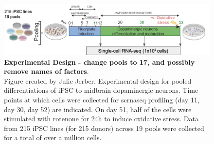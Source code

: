 \begin{figure}[h]
\centering
\includegraphics[width=15.5cm]{Chapter5/Fig/neuroseq_experimental_design.png}
\caption[Experimental Design]{\textbf{Experimental Design - change pools to 17, and possibly remove names of factors}.\\
Figure created by Julie Jerber.
Experimental design for pooled differentiations of iPSC to midbrain dopaminergic neurons. 
Time points at which cells were collected for \gls{scrnaseq} profiling (day 11, day 30, day 52) are indicated. 
On day 51, half of the cells were stimulated with rotenone for 24h to induce oxidative stress.
Data from 215 iPSC lines (for 215 donors) across 19 pools were collected for a total of over a million cells.}
\label{fig:neuroseq_experimental_design}
\end{figure}





